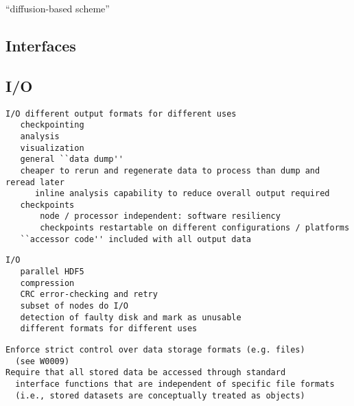\documentclass[10pt,twocolumn]{article}
\begin{document}

``diffusion-based scheme''

% 






\subsection{Interfaces} \label{ss:design-interfaces}

\subsection{I/O} \label{ss:design-io}

{\tiny
\begin{verbatim}
I/O different output formats for different uses
   checkpointing
   analysis
   visualization
   general ``data dump''
   cheaper to rerun and regenerate data to process than dump and reread later
      inline analysis capability to reduce overall output required
   checkpoints
       node / processor independent: software resiliency
       checkpoints restartable on different configurations / platforms
   ``accessor code'' included with all output data
\end{verbatim}
\begin{verbatim}
I/O
   parallel HDF5
   compression
   CRC error-checking and retry
   subset of nodes do I/O
   detection of faulty disk and mark as unusable
   different formats for different uses
\end{verbatim}

\begin{verbatim}
Enforce strict control over data storage formats (e.g. files)
  (see W0009)
Require that all stored data be accessed through standard
  interface functions that are independent of specific file formats
  (i.e., stored datasets are conceptually treated as objects)
\end{verbatim}
}
\end{document}
